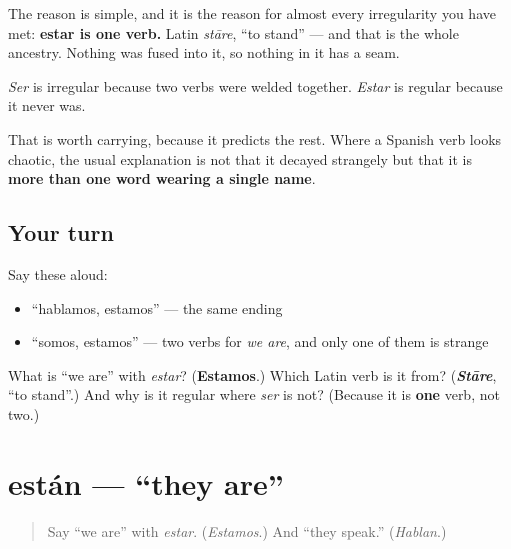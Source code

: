 \begin{cousinweb}
The reason is simple, and it is the reason for almost every irregularity you have met: \textbf{estar is one verb.} Latin \emph{stāre}, \textquotedblleft{}to stand\textquotedblright{} — and that is the whole ancestry. Nothing was fused into it, so nothing in it has a seam.

\emph{Ser} is irregular because two verbs were welded together. \emph{Estar} is regular because it never was.

That is worth carrying, because it predicts the rest. Where a Spanish verb looks chaotic, the usual explanation is not that it decayed strangely but that it is \textbf{more than one word wearing a single name}.
\end{cousinweb}

\subsection*{Your turn}
Say these aloud:

\begin{itemize}
\raggedright
  \item \textquotedblleft{}hablamos, estamos\textquotedblright{} — the same ending
  \item \textquotedblleft{}somos, estamos\textquotedblright{} — two verbs for \emph{we are}, and only one of them is strange
\end{itemize}

\begin{tcolorbox}[breakable,colback=teal!4,colframe=teal!35!black,title={Before you move on}]
What is \textquotedblleft{}we are\textquotedblright{} with \emph{estar}? (\textbf{Estamos}.) Which Latin verb is it from? (\emph{\textbf{Stāre}}, \textquotedblleft{}to stand\textquotedblright{}.) And why is it regular where \emph{ser} is not? (Because it is \textbf{one} verb, not two.)
\end{tcolorbox}
\section[están]{están — \textquotedblleft{}they are\textquotedblright{}}

\label{lesson:ES-C09-estan}



\begin{quote}
Say \textquotedblleft{}we are\textquotedblright{} with \emph{estar}. (\emph{Estamos}.) And \textquotedblleft{}they speak.\textquotedblright{} (\emph{Hablan}.)
\end{quote}


